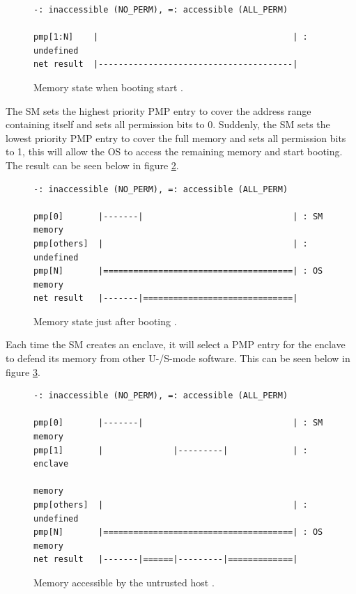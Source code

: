 \begin{figure}[h!]
\begin{lstlisting}[frame=single,showspaces=true]
-: inaccessible (NO_PERM), =: accessible (ALL_PERM)

pmp[1:N]    |                                       | : undefined
net result  |---------------------------------------|   
\end{lstlisting}
\caption{Memory state when booting start \cite{keystone-doc}. \label{sm-pmp-1}}
\end{figure}
\noindent
The SM sets the highest priority PMP entry to cover the address range containing itself and sets all permission bits to 0. Suddenly, the SM sets the lowest priority PMP entry to cover the full memory and sets all permission bits to 1, this will allow the OS to access the remaining memory and start booting. The result can be seen below in figure \ref{sm-pmp-2}.
\begin{figure}[H]
\begin{lstlisting}[frame=single,showspaces=true]
-: inaccessible (NO_PERM), =: accessible (ALL_PERM)

pmp[0]       |-------|                              | : SM memory
pmp[others]  |                                      | : undefined
pmp[N]       |======================================| : OS memory
net result   |-------|==============================|
\end{lstlisting}
\caption{Memory state just after booting \cite{keystone-doc}. \label{sm-pmp-2}}
\end{figure}
\noindent
Each time the SM creates an enclave, it will select a PMP entry for the enclave to defend its memory from other U-/S-mode software. This can be seen below in figure \ref{sm-pmp-3}.
\begin{figure}[H]
\begin{lstlisting}[frame=single,showspaces=true]
-: inaccessible (NO_PERM), =: accessible (ALL_PERM)

pmp[0]       |-------|                              | : SM memory
pmp[1]       |              |---------|             | : enclave 
                                                        memory
pmp[others]  |                                      | : undefined
pmp[N]       |======================================| : OS memory
net result   |-------|======|---------|=============|
\end{lstlisting}
\caption{Memory accessible by the untrusted host \cite{keystone-doc}. \label{sm-pmp-3}}
\end{figure}
